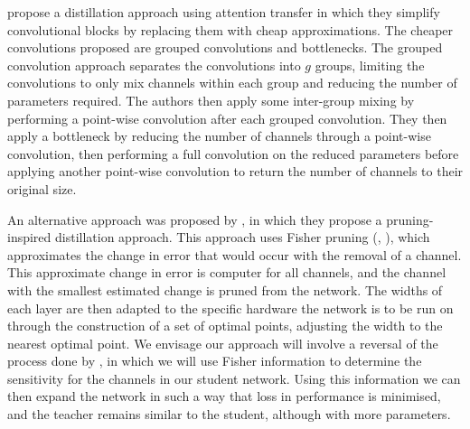 \documentclass[a4paper,11pt]{article}
\begin{document}
\cite{crowley2018moonshine} propose a distillation approach using attention transfer in which they simplify convolutional blocks by replacing them with cheap approximations. The cheaper convolutions proposed are grouped convolutions and bottlenecks. The grouped convolution approach separates the convolutions into $g$ groups, limiting the convolutions to only mix channels within each group and reducing the number of parameters required. The authors then apply some inter-group mixing by performing a point-wise convolution after each grouped convolution. They then apply a bottleneck by reducing the number of channels through a point-wise convolution, then performing a full convolution on the reduced parameters before applying another point-wise convolution to return the number of channels to their original size. 

An alternative approach was proposed by \cite{turner2019distilling}, in which they propose a pruning-inspired distillation approach. This approach uses Fisher pruning (\cite{theis2018faster}, \cite{molchanov2016pruning}), which approximates the change in error that would occur with the removal of a channel. This approximate change in error is computer for all channels, and the channel with the smallest estimated change is pruned from the network. The widths of each layer are then adapted to the specific hardware the network is to be run on through the construction of a set of optimal points, adjusting the width to the nearest optimal point. We envisage our approach will involve a reversal of the process done by \cite{turner2019distilling}, in which we will use Fisher information to determine the sensitivity for the channels in our student network. Using this information we can then expand the network in such a way that loss in performance is minimised, and the teacher remains similar to the student, although with more parameters.

\end{document}

